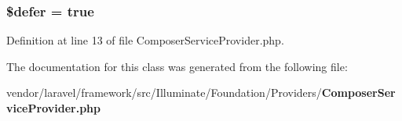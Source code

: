 \subsubsection[{\$defer}]{\setlength{\rightskip}{0pt plus 5cm}\$defer = true\hspace{0.3cm}{\ttfamily [protected]}}\label{class_illuminate_1_1_foundation_1_1_providers_1_1_composer_service_provider_af035ee3a0e66d50f2a013040b1d320b8}


Definition at line 13 of file Composer\+Service\+Provider.\+php.



The documentation for this class was generated from the following file\+:\begin{DoxyCompactItemize}
\item 
vendor/laravel/framework/src/\+Illuminate/\+Foundation/\+Providers/{\bf Composer\+Service\+Provider.\+php}\end{DoxyCompactItemize}
